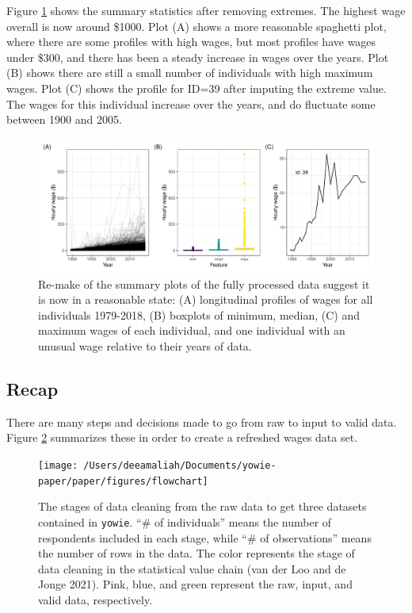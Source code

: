 \documentclass[12pt]{article}
\begin{document}
Figure \ref{fig:fixed-feature-plot} shows the summary statistics after removing extremes. The highest wage overall is now around \$1000. Plot (A) shows a more reasonable spaghetti plot, where there are some profiles with high wages, but most profiles have wages under \$300, and there has been a steady increase in wages over the years. Plot (B) shows there are still a small number of individuals with high maximum wages. Plot (C) shows the profile for ID=39 after imputing the extreme value. The wages for this individual increase over the years, and do fluctuate some between 1900 and 2005.

\begin{figure}

{\centering \includegraphics[width=1\linewidth]{figures/fixed-feature-plot-1} 

}

\caption{Re-make of the summary plots of the fully processed data suggest it is now in a reasonable state: (A) longitudinal profiles of wages for all individuals 1979-2018, (B) boxplots of minimum, median, (C) and maximum wages of each individual, and one individual with an unusual wage relative to their years of data. }\label{fig:fixed-feature-plot}
\end{figure}

\hypertarget{recap}{%
\subsection{Recap}\label{recap}}

There are many steps and decisions made to go from raw to input to valid data. Figure \ref{fig:flow-chart} summarizes these in order to create a refreshed wages data set.



\begin{figure}

{\centering \texttt{[image: /Users/deeamaliah/Documents/yowie-paper/paper/figures/flowchart]} 

}

\caption{The stages of data cleaning from the raw data to get three datasets contained in \texttt{yowie}. ``\# of individuals'' means the number of respondents included in each stage, while ``\# of observations'' means the number of rows in the data. The color represents the stage of data cleaning in the statistical value chain (van der Loo and de Jonge 2021). Pink, blue, and green represent the raw, input, and valid data, respectively.}\label{fig:flow-chart}
\end{figure}
\end{document}
